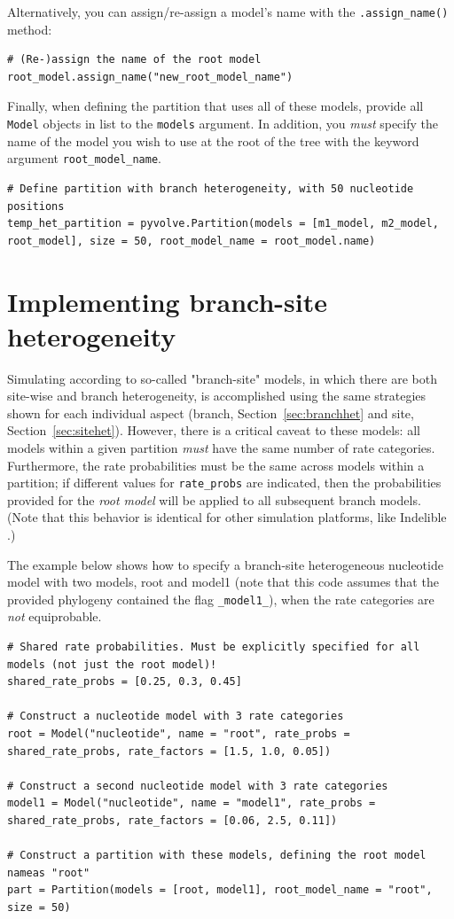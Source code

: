 \documentclass{article}
\newcommand{\code}[1]{\texttt{\small{#1}}}
\begin{document}
Alternatively, you can assign/re-assign a model's name with the \code{.assign\_name()} method:
\begin{lstlisting}
# (Re-)assign the name of the root model
root_model.assign_name("new_root_model_name")
\end{lstlisting}



Finally, when defining the partition that uses all of these models, provide all \code{Model} objects in list to the \code{models} argument. In addition, you \emph{must} specify the name of the model you wish to use at the root of the tree with the keyword argument \code{root\_model\_name}.
\begin{lstlisting}
# Define partition with branch heterogeneity, with 50 nucleotide positions
temp_het_partition = pyvolve.Partition(models = [m1_model, m2_model, root_model], size = 50, root_model_name = root_model.name) 
\end{lstlisting}



\section{Implementing branch-site heterogeneity}

Simulating according to so-called "branch-site" models, in which there are both site-wise and branch heterogeneity, is accomplished using the same strategies shown for each individual aspect (branch, Section~\ref{sec:branchhet} and site, Section~\ref{sec:sitehet}). However, there is a critical caveat to these models: all models within a given partition \emph{must} have the same number of rate categories. Furthermore, the rate probabilities must be the same across models within a partition; if different values for \code{rate\_probs} are indicated, then the probabilities provided for the \emph{root model} will be applied to all subsequent branch models. (Note that this behavior is identical for other simulation platforms, like Indelible \citep{Fletcher2009}.)

The example below shows how to specify a branch-site heterogeneous nucleotide model with two models, root and model1 (note that this code assumes that the provided phylogeny contained the flag \code{\_model1\_}), when the rate categories are \emph{not} equiprobable.
\begin{lstlisting}
# Shared rate probabilities. Must be explicitly specified for all models (not just the root model)!
shared_rate_probs = [0.25, 0.3, 0.45]

# Construct a nucleotide model with 3 rate categories
root = Model("nucleotide", name = "root", rate_probs = shared_rate_probs, rate_factors = [1.5, 1.0, 0.05])

# Construct a second nucleotide model with 3 rate categories
model1 = Model("nucleotide", name = "model1", rate_probs = shared_rate_probs, rate_factors = [0.06, 2.5, 0.11])

# Construct a partition with these models, defining the root model nameas "root"
part = Partition(models = [root, model1], root_model_name = "root", size = 50)
\end{lstlisting}
\end{document}
